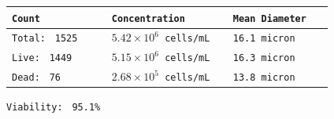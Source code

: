 \documentclass[UTF8,10pt,a4paper,fontset=fandol]{ctexart}
\newcommand{\fieldvalue}[1]{#1}
\begin{document}
\begin{tabular}{@{}p{0.29\linewidth}p{0.34\linewidth}p{0.29\linewidth}@{}}
\texttt{Count} & \texttt{Concentration} & \texttt{Mean Diameter} \\
\hline
\texttt{Total: }
\fieldvalue{\texttt{1525}}
&
\fieldvalue{\texttt{$5.42\times10^{6}$ cells/mL}}
&
\fieldvalue{\texttt{16.1 micron}}
\\[2pt]
\texttt{Live: }
\fieldvalue{\texttt{1449}}
&
\fieldvalue{\texttt{$5.15\times10^{6}$ cells/mL}}
&
\fieldvalue{\texttt{16.3 micron}}
\\[2pt]
\texttt{Dead: }
\fieldvalue{\texttt{76}}
&
\fieldvalue{\texttt{$2.68\times10^{5}$ cells/mL}}
&
\fieldvalue{\texttt{13.8 micron}}
\end{tabular}

\medskip

\noindent
\texttt{Viability: }
\fieldvalue{\texttt{95.1\%}}

\bigskip

\noindent
\begin{minipage}[t]{0.47\linewidth}
\centering
\fbox{\rule{0pt}{0.19\textheight}\rule{0.92\linewidth}{0pt}}
\end{minipage}
\hfill
\begin{minipage}[t]{0.47\linewidth}
\centering
\fbox{\rule{0pt}{0.19\textheight}\rule{0.92\linewidth}{0pt}}
\end{minipage}

\vspace{0.08\textheight}

\noindent
\begin{minipage}[t]{0.47\linewidth}
\centering
\fbox{\rule{0pt}{0.19\textheight}\rule{0.92\linewidth}{0pt}}
\end{minipage}
\hfill
\begin{minipage}[t]{0.47\linewidth}
\centering
\fbox{\rule{0pt}{0.19\textheight}\rule{0.92\linewidth}{0pt}}
\end{minipage}
\end{document}
